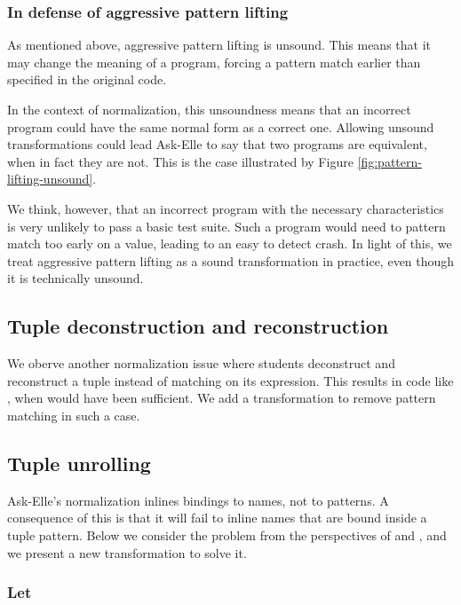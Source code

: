 \subsubsection{In defense of aggressive pattern lifting}

As mentioned above, aggressive pattern lifting is unsound. This means that it may change the meaning of a program, forcing a pattern match earlier than specified in the original code.

In the context of normalization, this unsoundness means that an incorrect program could have the same normal form as a correct one. Allowing unsound transformations could lead Ask-Elle to say that two programs are equivalent, when in fact they are not. This is the case illustrated by Figure \ref{fig:pattern-lifting-unsound}.

We think, however, that an incorrect program with the necessary characteristics is very unlikely to pass a basic test suite. Such a program would need to pattern match too early on a value, leading to an easy to detect crash. In light of this, we treat aggressive pattern lifting as a sound transformation in practice, even though it is technically unsound.


\subsection{Tuple deconstruction and reconstruction}

We oberve another normalization issue where students deconstruct and reconstruct a tuple instead of matching on its expression. This results in code like , when  would have been sufficient. We add a transformation to remove pattern matching in such a case.

\subsection{Tuple unrolling}

Ask-Elle's normalization inlines bindings to names, not to patterns. A consequence of this is that it will fail to inline names that are bound inside a tuple pattern. Below we consider the problem from the perspectives of  and , and we present a new transformation to solve it.

\subsubsection{Let}

